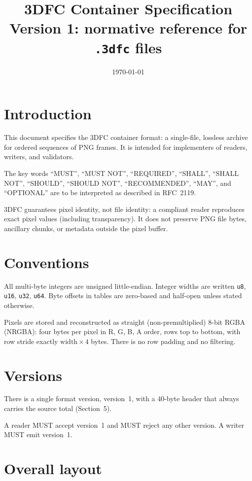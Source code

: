 \documentclass[11pt,a4paper]{article}
\title{3DFC Container Specification\\{\large Version 1: normative reference for \texttt{.3dfc} files}}
\author{}
\date{\today}
\begin{document}
\maketitle

\section{Introduction}

This document specifies the 3DFC container format: a single-file, lossless
archive for ordered sequences of PNG frames. It is intended for implementers
of readers, writers, and validators.

The key words ``MUST'', ``MUST NOT'', ``REQUIRED'', ``SHALL'', ``SHALL NOT'',
``SHOULD'', ``SHOULD NOT'', ``RECOMMENDED'', ``MAY'', and ``OPTIONAL'' are to
be interpreted as described in RFC~2119.

3DFC guarantees pixel identity, not file identity: a compliant reader
reproduces exact pixel values (including transparency). It does not preserve
PNG file bytes, ancillary chunks, or metadata outside the pixel buffer.

\section{Conventions}

All multi-byte integers are unsigned little-endian. Integer widths are written
\texttt{u8}, \texttt{u16}, \texttt{u32}, \texttt{u64}. Byte offsets in tables
are zero-based and half-open unless stated otherwise.

Pixels are stored and reconstructed as straight (non-premultiplied) 8-bit
RGBA (NRGBA): four bytes per pixel in R, G, B, A order, rows top to bottom,
with row stride exactly $\text{width} \times 4$ bytes. There is no row padding
and no filtering.

\section{Versions}

There is a single format version, version~1, with a 40-byte header that always
carries the source total (Section~5).

A reader MUST accept version~1 and MUST reject any other version. A writer
MUST emit version~1.

\section{Overall layout}
\end{document}

